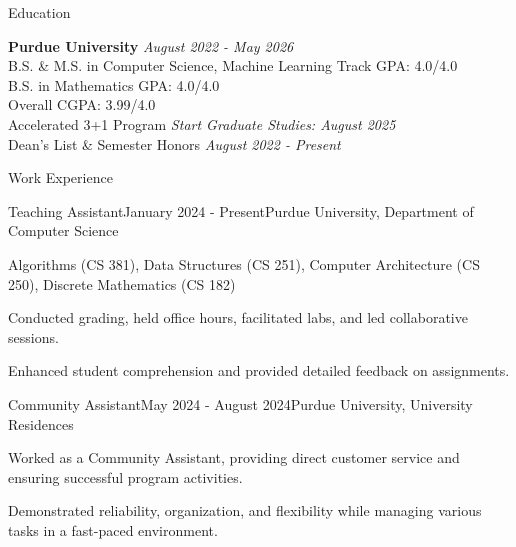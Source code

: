 \documentclass[
    11pt, %
]{resume} %
\begin{document}

\small
\begin{rSection}{Education}

    \textbf{Purdue University} \hfill \textit{August 2022 - May 2026} \\
    B.S. \& M.S. in Computer Science, Machine Learning Track \hfill GPA: 4.0/4.0 \\
    B.S. in Mathematics \hfill GPA: 4.0/4.0 \\
    \hspace*{\fill}  Overall CGPA: 3.99/4.0 \\
    Accelerated 3+1 Program \hfill {\em Start Graduate Studies: August 2025} \\
    Dean's List \& Semester Honors \hfill {\em August 2022 - Present}

\end{rSection}

\vspace*{-0.5cm}


\begin{rSection}{Work Experience}
\vspace*{-0.3cm}
    \begin{rSubsection}{Teaching Assistant}{January 2024 - Present}{Purdue University, Department of Computer Science}{}
        \item Algorithms (CS 381), Data Structures (CS 251), Computer Architecture (CS 250), Discrete Mathematics (CS 182)
        \item Conducted grading, held office hours, facilitated labs, and led collaborative sessions.
        \item Enhanced student comprehension and provided detailed feedback on assignments.
    \end{rSubsection}
    \begin{rSubsection}{Community Assistant}{May 2024 - August 2024}{Purdue University, University Residences}{}
      \item Worked as a Community Assistant, providing direct customer service and ensuring successful program activities. 
      \item Demonstrated reliability, organization, and flexibility while managing various tasks in a fast-paced environment.
    \end{rSubsection}
\end{rSection}
\end{document}
